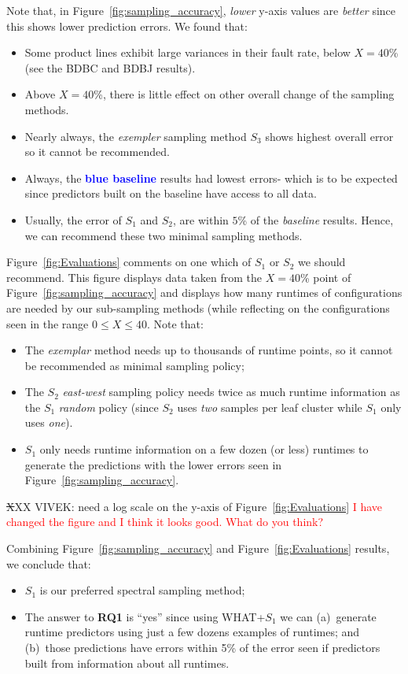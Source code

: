 \documentclass{sig-alternative}
\newcommand{\bi}{\begin{itemize}}%
\newcommand{\ei}{\end{itemize}}
\newcommand{\fig}[1]{Figure~\ref{fig:#1}}
\begin{document}
Note that, in  \fig{sampling_accuracy}, {\em lower} y-axis values are {\em better} since this shows lower
prediction errors. We found that:
\begin{itemize}

\item Some product lines exhibit large variances in their fault rate, below $X=40$\% (see the BDBC and BDBJ
results).
\item Above $X=40$\%, there is little effect on other overall change of the sampling methods.
\item
Nearly always, the {\em exempler} sampling method $S_3$ shows  highest overall error 
so it cannot be recommended.
\item Always, the  \textcolor{blue}{{\bf blue baseline}} results  had lowest errors- which is to be
expected since predictors built on the baseline have access to all data.
\item
Usually, the error of  $S_1$ and $S_2$, are within $5$\% of the {\em baseline} results.
Hence, we can recommend these two minimal sampling methods.
\end{itemize}
\fig{Evaluations} comments on one which  of    $S_1$ or $S_2$ we should recommend.
This figure displays data taken from the $X=40$\% point of \fig{sampling_accuracy} and displays
how many runtimes of configurations are needed by our sub-sampling methods (while
reflecting on the configurations seen in the range $0\le X \le 40$. Note that:
\bi
\item
The {\em exemplar} method needs up to thousands of runtime points, 
so it cannot be recommended as
minimal sampling
policy;
\item The $S_2$ {\em east-west} sampling policy needs twice as much runtime information as 
the $S_1$ {\em random} policy (since $S_2$ uses {\em two} samples per leaf cluster  while
$S_1$ only uses {\em one}).
\item $S_1$ only needs runtime information on a few dozen (or less) runtimes to generate
the predictions with the lower errors seen in \fig{sampling_accuracy}.
\ei
{\st XXX VIVEK: need a log scale on the y-axis of \fig{Evaluations} } 
\textcolor{red}{I have changed the figure and I think it looks good. What do you think?}

Combining \fig{sampling_accuracy} and \fig{Evaluations} results, we conclude that:
\bi
\item
$S_1$ is our preferred spectral sampling method;
\item
The answer to {\bf RQ1} is ``yes'' since using WHAT+$S_1$ we can (a)~generate runtime predictors
using just a few dozens examples of runtimes; and (b)~those predictions have errors
within 5\% of the error seen if predictors built from information about all runtimes.
\ei
\end{document}
